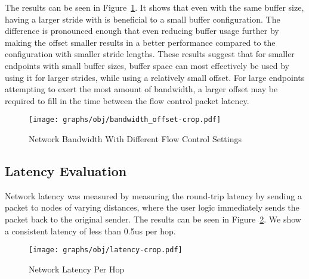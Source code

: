 The results can be seen in Figure~\ref{fig:bandwidth_offset}. It shows that even
with the same buffer size, having a larger stride with is
beneficial to a small buffer configuration. The difference is pronounced enough
that even reducing buffer usage further by making the offset smaller results
in a better performance compared to the configuration with smaller stride
lengths. These results suggest that for smaller endpoints with small buffer
sizes, buffer space can most effectively be used by using it for larger strides,
while using a relatively small offset. For large endpoints attempting to exert
the most amount of bandwidth, a larger offset may be required to fill in the
time between the flow control packet latency.

\begin{figure}[t]
	\begin{center}
	\texttt{[image: graphs/obj/bandwidth\_offset-crop.pdf]}
	\caption{Network Bandwidth With Different Flow Control Settings}
	\label{fig:bandwidth_offset}
	\end{center}
\end{figure}

\subsection{Latency Evaluation}

Network latency was measured by measuring the round-trip latency by sending a
packet to nodes of varying distances, where the user logic immediately sends the
packet back to the original sender. The results can be seen in
Figure~\ref{fig:latency}. We show a consistent latency of less than 0.5us per
hop.

\begin{figure}[b]
	\begin{center}
	\texttt{[image: graphs/obj/latency-crop.pdf]}
	\caption{Network Latency Per Hop}
	\label{fig:latency}
	\end{center}
\end{figure}




